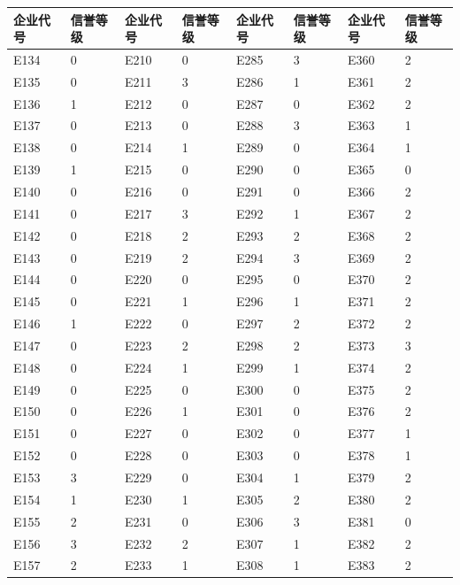 \documentclass[UTF8]{ctexart}
\begin{document}
			\begin{table}[H]
				\centering
				\begin{tabular}{|l|l|l|l|l|l|l|l|}
				\hline
					企业代号 & 信誉等级 & 企业代号 & 信誉等级 & 企业代号 & 信誉等级 & 企业代号 & 信誉等级 \\ \hline
					E134 & 0 & E210 & 0 & E285 & 3 & E360 & 2 \\ \hline
					E135 & 0 & E211 & 3 & E286 & 1 & E361 & 2 \\ \hline
					E136 & 1 & E212 & 0 & E287 & 0 & E362 & 2 \\ \hline
					E137 & 0 & E213 & 0 & E288 & 3 & E363 & 1 \\ \hline
					E138 & 0 & E214 & 1 & E289 & 0 & E364 & 1 \\ \hline
					E139 & 1 & E215 & 0 & E290 & 0 & E365 & 0 \\ \hline
					E140 & 0 & E216 & 0 & E291 & 0 & E366 & 2 \\ \hline
					E141 & 0 & E217 & 3 & E292 & 1 & E367 & 2 \\ \hline
					E142 & 0 & E218 & 2 & E293 & 2 & E368 & 2 \\ \hline
					E143 & 0 & E219 & 2 & E294 & 3 & E369 & 2 \\ \hline
					E144 & 0 & E220 & 0 & E295 & 0 & E370 & 2 \\ \hline
					E145 & 0 & E221 & 1 & E296 & 1 & E371 & 2 \\ \hline
					E146 & 1 & E222 & 0 & E297 & 2 & E372 & 2 \\ \hline
					E147 & 0 & E223 & 2 & E298 & 2 & E373 & 3 \\ \hline
					E148 & 0 & E224 & 1 & E299 & 1 & E374 & 2 \\ \hline
					E149 & 0 & E225 & 0 & E300 & 0 & E375 & 2 \\ \hline
					E150 & 0 & E226 & 1 & E301 & 0 & E376 & 2 \\ \hline
					E151 & 0 & E227 & 0 & E302 & 0 & E377 & 1 \\ \hline
					E152 & 0 & E228 & 0 & E303 & 0 & E378 & 1 \\ \hline
					E153 & 3 & E229 & 0 & E304 & 1 & E379 & 2 \\ \hline
					E154 & 1 & E230 & 1 & E305 & 2 & E380 & 2 \\ \hline
					E155 & 2 & E231 & 0 & E306 & 3 & E381 & 0 \\ \hline
					E156 & 3 & E232 & 2 & E307 & 1 & E382 & 2 \\ \hline
					E157 & 2 & E233 & 1 & E308 & 1 & E383 & 2 \\ \hline

\end{tabular}
\end{table}
\end{document}
